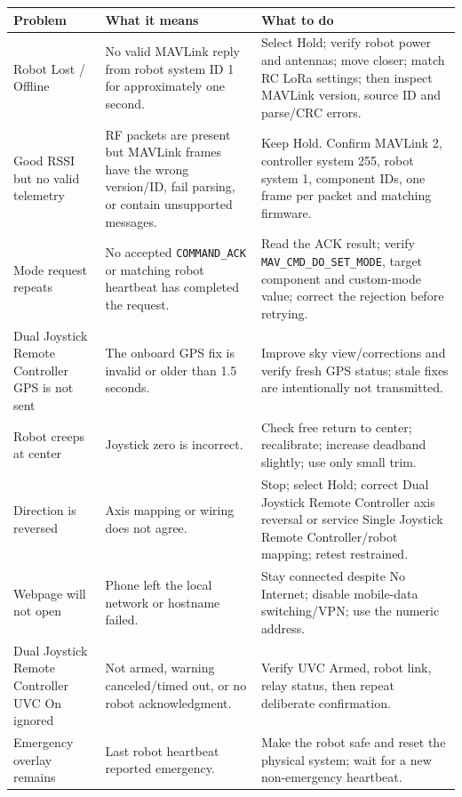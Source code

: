 \documentclass[
  10pt,
  letterpaper,
  openany]{report}
\newcounter{none} %
\begin{document}
{\def\LTcaptype{none} %
\begin{longtable}[]{@{}
  >{\raggedright\arraybackslash}p{}
  >{\raggedright\arraybackslash}p{}
  >{\raggedright\arraybackslash}p{}@{}}
\toprule\noalign{}
\begin{minipage}[b]{\linewidth}\raggedright
Problem
\end{minipage} & \begin{minipage}[b]{\linewidth}\raggedright
What it means
\end{minipage} & \begin{minipage}[b]{\linewidth}\raggedright
What to do
\end{minipage} \\
\midrule\noalign{}
\endhead
\bottomrule\noalign{}
\endlastfoot
Robot Lost / Offline & No valid MAVLink reply from robot system ID 1 for
approximately one second. & Select Hold; verify robot power and
antennas; move closer; match RC LoRa settings; then inspect MAVLink
version, source ID and parse/CRC errors. \\
Good RSSI but no valid telemetry & RF packets are present but MAVLink
frames have the wrong version/ID, fail parsing, or contain unsupported
messages. & Keep Hold. Confirm MAVLink 2, controller system 255, robot
system 1, component IDs, one frame per packet and matching firmware. \\
Mode request repeats & No accepted \texttt{COMMAND\_ACK} or matching
robot heartbeat has completed the request. & Read the ACK result; verify
\texttt{MAV\_CMD\_DO\_SET\_MODE}, target component and custom-mode
value; correct the rejection before retrying. \\
Dual Joystick Remote Controller GPS is not sent & The onboard GPS fix is
invalid or older than 1.5 seconds. & Improve sky view/corrections and
verify fresh GPS status; stale fixes are intentionally not
transmitted. \\
Robot creeps at center & Joystick zero is incorrect. & Check free return
to center; recalibrate; increase deadband slightly; use only small
trim. \\
Direction is reversed & Axis mapping or wiring does not agree. & Stop;
select Hold; correct Dual Joystick Remote Controller axis reversal or
service Single Joystick Remote Controller/robot mapping; retest
restrained. \\
Webpage will not open & Phone left the local network or hostname failed.
& Stay connected despite No Internet; disable mobile-data switching/VPN;
use the numeric address. \\
Dual Joystick Remote Controller UVC On ignored & Not armed, warning
canceled/timed out, or no robot acknowledgment. & Verify UVC Armed,
robot link, relay status, then repeat deliberate confirmation. \\
Emergency overlay remains & Last robot heartbeat reported emergency. &
Make the robot safe and reset the physical system; wait for a new
non-emergency heartbeat. \\
\end{longtable}
}
\end{document}
